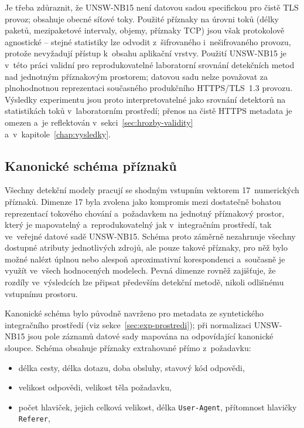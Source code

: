 Je třeba zdůraznit, že UNSW-NB15 není datovou sadou specifickou pro čistě TLS provoz; obsahuje obecné síťové toky. Použité příznaky na úrovni toků (délky paketů, mezipaketové intervaly, objemy, příznaky TCP) jsou však protokolově agnostické -- stejné statistiky lze odvodit z~šifrovaného i~nešifrovaného provozu, protože nevyžadují přístup k~obsahu aplikační vrstvy. Použití UNSW-NB15 je v~této práci validní pro reprodukovatelné laboratorní srovnání detekčních metod nad jednotným příznakovým prostorem; datovou sadu nelze považovat za plnohodnotnou reprezentaci současného produkčního HTTPS/TLS~1.3 provozu. Výsledky experimentu jsou proto interpretovatelné jako srovnání detektorů na statistikách toků v~laboratorním prostředí; přenos na čistě HTTPS metadata je omezen a~je reflektován v~sekci~\ref{sec:hrozby-validity} a~v~kapitole~\ref{chap:vysledky}.

\subsection{Kanonické schéma příznaků}
\label{sec:kanonicke-schema}

Všechny detekční modely pracují se shodným vstupním vektorem 17~numerických příznaků. Dimenze 17 byla zvolena jako kompromis mezi dostatečně bohatou reprezentací tokového chování a~požadavkem na jednotný příznakový prostor, který je mapovatelný a~reprodukovatelný jak v~integračním prostředí, tak ve~veřejné datové sadě UNSW-NB15. Schéma proto záměrně nezahrnuje všechny dostupné atributy jednotlivých zdrojů, ale pouze takové příznaky, pro něž bylo možné nalézt úplnou nebo alespoň aproximativní korespondenci a~současně je využít ve~všech hodnocených modelech. Pevná dimenze rovněž zajišťuje, že rozdíly ve~výsledcích lze připsat především detekční metodě, nikoli odlišnému vstupnímu prostoru.

Kanonické schéma bylo původně navrženo pro metadata ze syntetického integračního prostředí (viz sekce~\ref{sec:exp-prostredi}); při normalizaci UNSW-NB15 jsou pole záznamů datové sady mapována na odpovídající kanonické sloupce. Schéma obsahuje příznaky extrahované přímo z~požadavku:

\begin{itemize}
\item délka cesty, délka dotazu, doba obsluhy, stavový kód odpovědi,
\item velikost odpovědi, velikost těla požadavku,
\item počet hlaviček, jejich celková velikost, délka \texttt{User-Agent}, přítomnost hlavičky \texttt{Referer},
\end{itemize}

